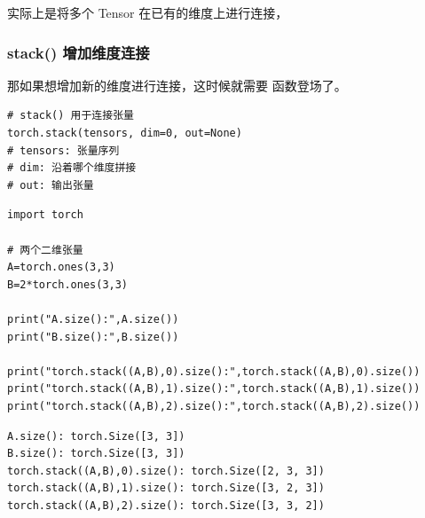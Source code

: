  实际上是将多个 Tensor 在已有的维度上进行连接，

\subsubsection{stack() 增加维度连接}
\label{subsubsec:Pytorch的stack()函数}
那如果想增加新的维度进行连接，这时候就需要  函数登场了。
\begin{lstlisting}[style=demostyle,numbers=none]
# stack() 用于连接张量
torch.stack(tensors, dim=0, out=None)
# tensors: 张量序列
# dim: 沿着哪个维度拼接
# out: 输出张量
\end{lstlisting}
\begin{lstlisting}[style=pythonstyle]
import torch

# 两个二维张量
A=torch.ones(3,3)
B=2*torch.ones(3,3)

print("A.size():",A.size())
print("B.size():",B.size())

print("torch.stack((A,B),0).size():",torch.stack((A,B),0).size())
print("torch.stack((A,B),1).size():",torch.stack((A,B),1).size())
print("torch.stack((A,B),2).size():",torch.stack((A,B),2).size())
\end{lstlisting}

\begin{lstlisting}[style=demostyle,numbers=none]
A.size(): torch.Size([3, 3])
B.size(): torch.Size([3, 3])
torch.stack((A,B),0).size(): torch.Size([2, 3, 3])
torch.stack((A,B),1).size(): torch.Size([3, 2, 3])
torch.stack((A,B),2).size(): torch.Size([3, 3, 2])
\end{lstlisting}

